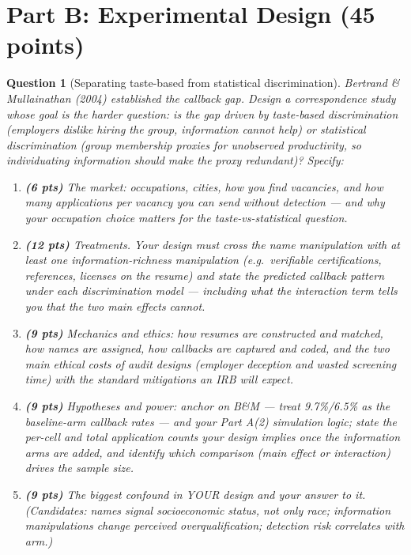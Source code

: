 \documentclass[11pt]{article}
\newtheorem{question}{Question}
\begin{document}
\section*{Part B: Experimental Design (45 points)}

\begin{question}[Separating taste-based from statistical discrimination]
Bertrand \& Mullainathan (2004) established the callback gap. Design a
correspondence study whose goal is the harder question: is the gap
driven by \emph{taste-based} discrimination (employers dislike hiring
the group, information cannot help) or \emph{statistical} discrimination
(group membership proxies for unobserved productivity, so individuating
information should make the proxy redundant)? Specify:
\begin{enumerate}[label=(\alph*)]
  \item \textbf{(6 pts)} The market: occupations, cities, how you find
        vacancies, and how many applications per vacancy you can send
        without detection --- and why your occupation choice matters for
        the taste-vs-statistical question.
  \item \textbf{(12 pts)} Treatments. Your design must cross the name
        manipulation with at least one \emph{information-richness}
        manipulation (e.g.\ verifiable certifications, references,
        licenses on the resume) and state the predicted callback
        pattern under each discrimination model --- including what the
        interaction term tells you that the two main effects cannot.
  \item \textbf{(9 pts)} Mechanics and ethics: how resumes are
        constructed and matched, how names are assigned, how callbacks
        are captured and coded, and the two main ethical costs of audit
        designs (employer deception and wasted screening time) with the
        standard mitigations an IRB will expect.
  \item \textbf{(9 pts)} Hypotheses and power: anchor on B\&M --- treat
        9.7\%/6.5\% as the \emph{baseline-arm} callback rates --- and
        your Part A(2) simulation logic; state the per-cell and total
        application counts your design implies once the information
        arms are added, and identify which comparison (main effect or
        interaction) drives the sample size.
  \item \textbf{(9 pts)} The biggest confound in YOUR design and your
        answer to it. (Candidates: names signal socioeconomic status,
        not only race; information manipulations change perceived
        overqualification; detection risk correlates with arm.)
\end{enumerate}
\end{question}
\end{document}
